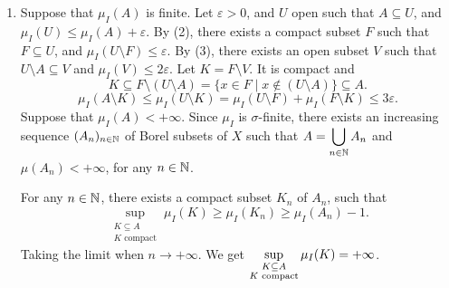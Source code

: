 \begin{proofenv}
\begin{enumerate}[label=(\arabic*)]
            Let $f \in C_{c}(X)^\uparrow$, $t \in \RR$.
            We claim that
            $$U_{f,t} \coloneq \{x \in X \mid f(x) > t\} = f^{-1} \left(\interval[open]{t}{+\infty}\right)$$
            is open.
            In fact, if $(f_n)_{n \in \NN}$ is an increasing sequence of function in $C_{c}(X)$ that converges pointwise to $f$,
            then
            $$U_{f,t} = \bigcup_{n \in \NN} \{x \in X \mid f_{n}(x) > t\}.$$
            Now let $(g_{n})_{n \in \NN}$ be a decreasing sequence in $C_c(X)^\uparrow$ such that $g_{n} \ge \mathbbm{1}_{A}$ for any $n \in \NN$ and $\dis \lim_{n \rightarrow +\infty} I(g_n) = \mu_{I}(A)$.
            Let $\varepsilon \in \interval[open]{0}{1}$.
            For any $n \in \NN$, 
            $$U_{g,1-\varepsilon} \coloneq \{x \in X \mid g_{n}(x) > 1 - \varepsilon\}$$
            is open, and $g_{n} \ge (1 - \varepsilon) \mathbbm{1}_{U_{g_{n}, 1 - \varepsilon}}$, $\mu_{I}(A) \le \mu_{I}(U_{g_n,1 - \varepsilon}) \le \frac{I(g_n)}{1 - \varepsilon}$.
            $\dis \inf_{\substack{U \supseteq A\\ U \text{ open}}} \mu_{I}(U) \le \frac{\mu_{I}(A)}{1 - \varepsilon}$.
            Take $\varepsilon \rightarrow 0$.
        \item Suppose that $\mu_{I}(A)$ is finite.
            Let $\varepsilon > 0$, and $U$ open such that $A \subseteq U$, and $\mu_{I}(U) \le \mu_{I}(A) + \varepsilon$.
            By (2), there exists a compact subset $F$ such that $F \subseteq U$, and $\mu_{I}(U\setminus F) \le \varepsilon$.
            By (3), there exists an open subset $V$ such that $U\setminus A \subseteq V$ and $\mu_{I}(V) \le 2 \varepsilon$.
            Let $K = F \setminus V$.
            It is compact and
            $$K \subseteq F \setminus (U \setminus A) = \{x \in F \mid x \notin (U \setminus A)\} \subseteq A.$$
            $$\mu_{I}(A \setminus K) \le \mu_{I}(U \setminus K) = \mu_{I}(U \setminus F) + \mu_{I}(F \setminus K) \le 3 \varepsilon.$$
            Suppose that $\mu_{I}(A) < +\infty$.
            Since $\mu_{I}$ is $\sigma$-finite,
            there exists an increasing sequence $(A_n)_{n \in \mathbb{N}}$ of Borel subsets of $X$ such that $\displaystyle A = \bigcup_{n \in \mathbb{N}} A_{n}$ and $\mu(A_n) < +\infty$, for any $n \in \NN$.

            \quad For any $n \in \NN$, there exists a compact subset $K_n$ of $A_n$, such that
            $$\sup_{\substack{K\subseteq A\\K \text{ compact}}}\mu_{I}(K) \ge \mu_{I}(K_n) \ge \mu_{I}(A_n) - 1.$$
            Taking the limit when $n \rightarrow +\infty$.
            We get $\displaystyle \sup_{\substack{K \subseteq A\\ K \text{ compact}}} \mu_{I}(K) = +\infty$.
    \end{enumerate}
\end{proofenv}


